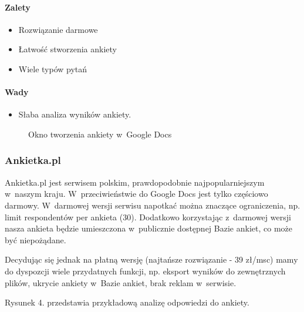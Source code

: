 \documentclass[8pt,a4paper,notitlepage]{article}
\begin{document}
\paragraph{Zalety}
\begin{itemize}
\item Rozwiązanie darmowe
\item Łatwość stworzenia ankiety
\item Wiele typów pytań
\end{itemize}

\paragraph{Wady}
\begin{itemize}
\item Słaba analiza wyników ankiety.
\end{itemize}

\begin{figure}[H]
\begin{center}
\caption{Okno tworzenia ankiety w~Google Docs}
\end{center}
\end{figure}

\subsubsection{Ankietka.pl}
Ankietka.pl jest serwisem polskim, prawdopodobnie najpopularniejszym w~naszym kraju. W~przeciwieństwie do Google Docs jest tylko częściowo darmowy. W~darmowej wersji serwisu napotkać można znaczące ograniczenia, np. limit respondentów per ankieta (30). Dodatkowo korzystając z~darmowej wersji nasza ankieta będzie umieszczona w~publicznie dostępnej Bazie ankiet, co może być niepożądane.
\par Decydując się jednak na płatną wersję (najtańsze rozwiązanie - 39 zł/msc) mamy do dyspozcji wiele przydatnych funkcji, np. eksport wyników do zewnętrznych plików, ukrycie ankiety w~Bazie ankiet, brak reklam w~serwisie.
\par Rysunek 4. przedstawia przykładową analizę odpowiedzi do ankiety.
\end{document}
